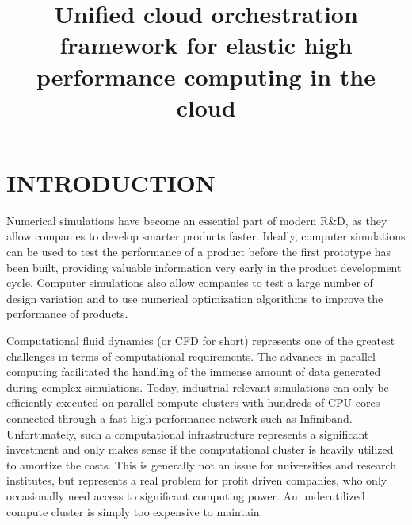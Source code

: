 \documentclass[a4paper,twoside]{article}
\begin{document}
\title{Unified cloud orchestration framework for elastic high performance computing in the cloud }

\author{
}




\abstract{

}

\onecolumn \maketitle \normalsize \vfill

\section{\uppercase{Introduction}}
\label{sec:introduction}

\noindent Numerical simulations have become an essential part of modern R\&D, as they allow companies to develop smarter products faster. Ideally, computer simulations can be used to test the performance of a product before the first prototype has been built, providing valuable information very early in the product development cycle. Computer simulations also allow companies to test a large number of design variation and to use numerical optimization algorithms to improve the performance of products.
 
Computational fluid dynamics (or CFD for short) represents one of the greatest challenges in terms of computational requirements. The advances in parallel computing facilitated the handling of the immense amount of data generated during complex simulations. Today, industrial-relevant simulations can only be efficiently executed on parallel compute clusters with hundreds of CPU cores connected through a fast high-performance network such as Infiniband. Unfortunately, such a computational infrastructure represents a significant investment and only makes sense if the computational cluster is heavily utilized to amortize the costs. This is generally not an issue for universities and research institutes, but represents a real problem for profit driven companies, who only occasionally need access to significant computing power. An underutilized compute cluster is simply too expensive to maintain.
 
\end{document}
